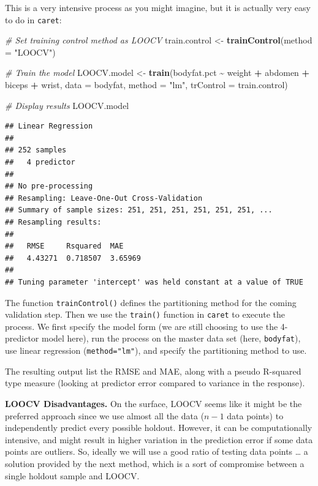 \documentclass[
]{book}
\newenvironment{Shaded}{\begin{snugshade}}{\end{snugshade}}
\newcommand{\AttributeTok}[1]{\textcolor[rgb]{0.13,0.29,0.53}{#1}}
\newcommand{\CommentTok}[1]{\textcolor[rgb]{0.56,0.35,0.01}{\textit{#1}}}
\newcommand{\FunctionTok}[1]{\textcolor[rgb]{0.13,0.29,0.53}{\textbf{#1}}}
\newcommand{\NormalTok}[1]{#1}
\newcommand{\OtherTok}[1]{\textcolor[rgb]{0.56,0.35,0.01}{#1}}
\newcommand{\SpecialCharTok}[1]{\textcolor[rgb]{0.81,0.36,0.00}{\textbf{#1}}}
\newcommand{\StringTok}[1]{\textcolor[rgb]{0.31,0.60,0.02}{#1}}
\begin{document}
This is a very intensive process as you might imagine, but it is actually very easy to do in \texttt{caret}:

\begin{Shaded}
\begin{Highlighting}[]
\CommentTok{\# Set training control method as LOOCV}
\NormalTok{train.control }\OtherTok{\textless{}{-}} \FunctionTok{trainControl}\NormalTok{(}\AttributeTok{method =} \StringTok{"LOOCV"}\NormalTok{)}

\CommentTok{\# Train the model}
\NormalTok{LOOCV.model }\OtherTok{\textless{}{-}} \FunctionTok{train}\NormalTok{(bodyfat.pct }\SpecialCharTok{\textasciitilde{}}\NormalTok{ weight }\SpecialCharTok{+}\NormalTok{ abdomen }\SpecialCharTok{+}\NormalTok{ biceps }\SpecialCharTok{+}\NormalTok{ wrist, }
                     \AttributeTok{data =}\NormalTok{ bodyfat, }
                     \AttributeTok{method =} \StringTok{"lm"}\NormalTok{,}
                     \AttributeTok{trControl =}\NormalTok{ train.control)}

\CommentTok{\# Display results}
\NormalTok{LOOCV.model}
\end{Highlighting}
\end{Shaded}

\begin{verbatim}
## Linear Regression 
## 
## 252 samples
##   4 predictor
## 
## No pre-processing
## Resampling: Leave-One-Out Cross-Validation 
## Summary of sample sizes: 251, 251, 251, 251, 251, 251, ... 
## Resampling results:
## 
##   RMSE     Rsquared  MAE    
##   4.43271  0.718507  3.65969
## 
## Tuning parameter 'intercept' was held constant at a value of TRUE
\end{verbatim}

The function \texttt{trainControl()} defines the partitioning method for the coming validation step. Then we use the \texttt{train()} function in \texttt{caret} to execute the process. We first specify the model form (we are still choosing to use the 4-predictor model here), run the process on the master data set (here, \texttt{bodyfat}), use linear regression (\texttt{method="lm"}), and specify the partitioning method to use.

The resulting output list the RMSE and MAE, along with a pseudo R-squared type measure (looking at predictor error compared to variance in the response).

\textbf{LOOCV Disadvantages.} On the surface, LOOCV seems like it might be the preferred approach since we use almost all the data (\(n-1\) data points) to independently predict every possible holdout. However, it can be computationally intensive, and might result in higher variation in the prediction error if some data points are outliers. So, ideally we will use a good ratio of testing data points \ldots{} a solution provided by the next method, which is a sort of compromise between a single holdout sample and LOOCV.
\end{document}
